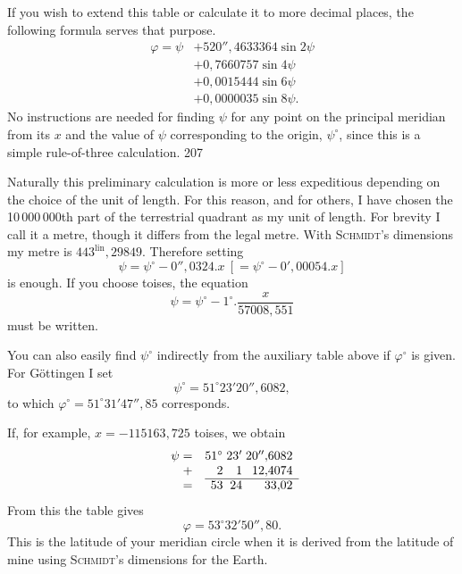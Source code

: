 If you wish to extend this table or calculate it to more decimal places, the following formula serves that purpose.
\[
\begin{aligned}
\varphi=\psi&+520''{,}4633364\sin2\psi\\
&+0{,}7660757\sin4\psi\\
&+0{,}0015444\sin6\psi\\
&+0{,}0000035\sin8\psi.
\end{aligned}
\]
No instructions are needed for finding $\psi$ for any point on the principal meridian from its $x$ and the value of $\psi$ corresponding to the origin, $\psi^\circ$, since this is a simple rule-of-three calculation.
\clearpage
{}\hfill207\par\medskip
Naturally this preliminary calculation is more or less expeditious depending on the choice of the unit of length. For this reason, and for others, I have chosen the 10\,000\,000th part of the terrestrial quadrant as my unit of length. For brevity I call it a metre, though it differs from the legal metre. With \textsc{Schmidt}'s dimensions my metre is $443^{\mathrm{lin}}{,}29849$. Therefore setting
\[
\psi=\psi^\circ-0''{,}0324.x\ [=\psi^\circ-0'{,}00054.x]
\]
is enough. If you choose toises, the equation
\[
\psi=\psi^\circ-1^\circ.\frac{x}{57008{,}551}
\]
must be written.

You can also easily find $\psi^\circ$ indirectly from the auxiliary table above if $\varphi^\circ$ is given. For Göttingen I set
\[
\psi^\circ=51^\circ23'20''{,}6082,
\]
to which $\varphi^\circ=51^\circ31'47''{,}85$ corresponds.

If, for example, $x=-115163{,}725$ toises, we obtain
\[
\begin{array}{r@{\quad}r@{\;}r@{\;}r}
\psi=&51^\circ&23'&20''{,}6082\\
+&2&1&12{,}4074\\\cline{2-4}
=&53&24&33{,}02
\end{array}
\]
From this the table gives
\[
\varphi=53^\circ32'50''{,}80.
\]
This is the latitude of your meridian circle when it is derived from the latitude of mine using \textsc{Schmidt}'s dimensions for the Earth.

